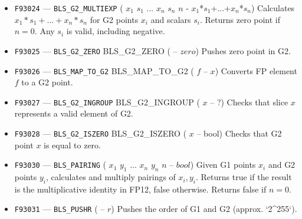 \documentclass[12pt,oneside]{article}
\begin{document}
\begin{itemize}
\item {\tt F93024} --- {\tt BLS_G2_MULTIEXP} ( $x_1$ $s_1$ ... $x_n$ $s_n$ $n$ - $x_1$*$s_1$+...+$x_n$*$s_n$) Calculates $x_1*s_1+...+x_n*s_n$ for G2 points $x_i$ and scalars $s_i$. Returns zero point if $n=0$. Any $s_i$ is valid, including negative.
\item {\tt F93025} --- {\tt BLS_G2_ZERO} BLS_G2_ZERO ( -- $zero$) Pushes zero point in G2.
\item {\tt F93026} --- {\tt BLS_MAP_TO_G2} BLS_MAP_TO_G2 ( $f$ -- $x$) Converts FP element $f$ to a G2 point.
\item {\tt F93027} --- {\tt BLS_G2_INGROUP} BLS_G2_INGROUP ( $x$ -- $?$) Checks that slice $x$ represents a valid element of G2.
\item {\tt F93028} --- {\tt BLS_G2_ISZERO} BLS_G2_ISZERO ( $x$ -- bool) Checks that G2 point $x$ is equal to zero.

\item {\tt F93030} --- {\tt BLS_PAIRING} ( $x_1$ $y_1$ ... $x_n$ $y_n$ $n$ -- $bool$) Given G1 points $x_i$ and G2 points $y_i$, calculates and multiply pairings of $x_i, y_i$. Returns true if the result is the multiplicative identity in FP12, false otherwise. Returns false if $n=0$.
\item {\tt F93031} --- {\tt BLS_PUSHR} ( -- $r$) Pushes the order of G1 and G2 (approx. `2^255`).
\end{itemize}
\end{document}
